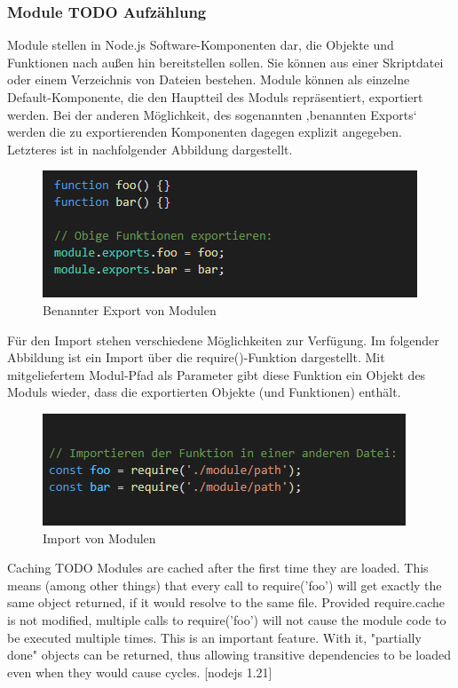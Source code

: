 \newpage
\subsubsection{Module TODO Aufzählung}

Module stellen in Node.js Software-Komponenten dar, die Objekte und Funktionen nach außen hin bereitstellen sollen. Sie können aus einer Skriptdatei oder einem Verzeichnis von Dateien bestehen. Module können als einzelne Default-Komponente, die den Hauptteil des Moduls repräsentiert, exportiert werden. Bei der anderen Möglichkeit, des sogenannten ‚benannten Exports‘ werden die zu exportierenden Komponenten dagegen explizit angegeben. Letzteres ist in nachfolgender Abbildung dargestellt. 
\newline
  
\begin{figure}[h]
\centering
\includegraphics{images/nodejs_moduleExport.PNG}
\caption{Benannter Export von Modulen}
\end{figure}
 
Für den Import stehen verschiedene Möglichkeiten zur Verfügung. Im folgender Abbildung ist ein Import über die require()-Funktion dargestellt. Mit mitgeliefertem Modul-Pfad als Parameter gibt diese Funktion ein Objekt des Moduls wieder, dass die exportierten Objekte (und Funktionen) enthält.
\newline
  
\begin{figure}[h]
\centering
\includegraphics{images/nodejs_moduleImport.PNG}
\caption{Import von Modulen}
\end{figure}

Caching TODO
Modules are cached after the first time they are loaded. This means (among other things) that every call to require('foo') will get exactly the same object returned, if it would resolve to the same file.\newline
Provided require.cache is not modified, multiple calls to require('foo') will not cause the module code to be executed multiple times. This is an important feature. With it, "partially done" objects can be returned, thus allowing transitive dependencies to be loaded even when they would cause cycles. [nodejs 1.21]



